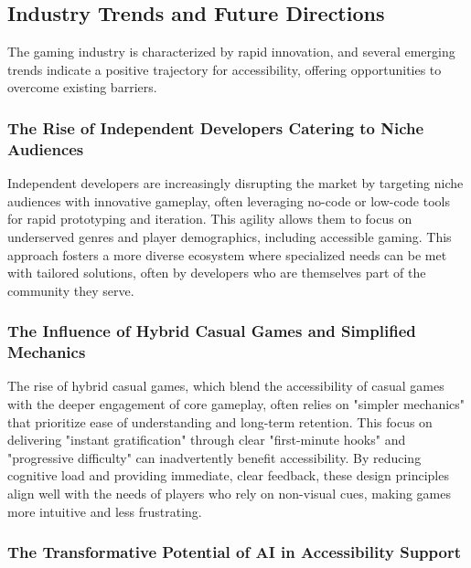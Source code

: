 \subsection{Industry Trends and Future Directions}

The gaming industry is characterized by rapid innovation, and several emerging trends indicate a positive trajectory for accessibility, offering opportunities to overcome existing barriers.

\subsubsection{The Rise of Independent Developers Catering to Niche Audiences}

Independent developers are increasingly disrupting the market by targeting niche audiences with innovative gameplay, often leveraging no-code or low-code tools for rapid prototyping and iteration\supercite{SegwiseTrends2025}. This agility allows them to focus on underserved genres and player demographics, including accessible gaming. This approach fosters a more diverse ecosystem where specialized needs can be met with tailored solutions, often by developers who are themselves part of the community they serve.

\subsubsection{The Influence of Hybrid Casual Games and Simplified Mechanics}

The rise of hybrid casual games, which blend the accessibility of casual games with the deeper engagement of core gameplay, often relies on "simpler mechanics" that prioritize ease of understanding and long-term retention\supercite{SegwiseTrends2025}. This focus on delivering "instant gratification" through clear "first-minute hooks" and "progressive difficulty" can inadvertently benefit accessibility. By reducing cognitive load and providing immediate, clear feedback, these design principles align well with the needs of players who rely on non-visual cues, making games more intuitive and less frustrating\supercite{SegwiseTrends2025}.

\subsubsection{The Transformative Potential of AI in Accessibility Support}

